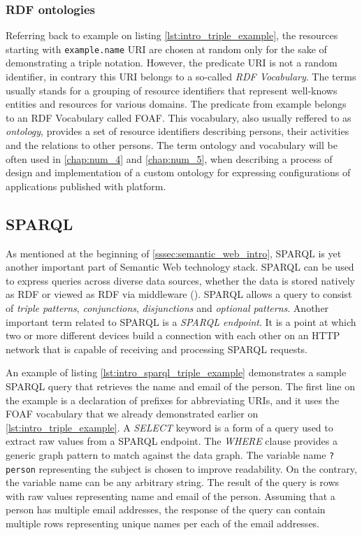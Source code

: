 \subsubsection{RDF ontologies}

Referring back to example on listing \autoref{lst:intro_triple_example}, the resources starting with \texttt{example.name} URI are chosen at random only for the sake of demonstrating a triple notation. However, the predicate URI is not a random identifier, in contrary this URI belongs to a so-called \textit{RDF Vocabulary}. The terms usually stands for a grouping of resource identifiers that represent well-knows entities and resources for various domains. The predicate from example belongs to an RDF Vocabulary called \gls{FOAF}. This vocabulary, also usually reffered to as \textit{ontology}, provides a set of resource identifiers describing persons, their activities and the relations to other persons. The term ontology and vocabulary will be often used in \autoref{chap:num_4} and \autoref{chap:num_5}, when describing a process of design and implementation of a custom ontology for expressing configurations of applications published with \lpa{} platform.

\subsection{SPARQL}

As mentioned at the beginning of \autoref{sssec:semantic_web_intro}, SPARQL is yet another important part of Semantic Web technology stack. SPARQL can be used to express queries across diverse data sources, whether the data is stored natively as RDF or viewed as RDF via middleware (\cite{Seaborne:08:SQL}). SPARQL allows a query to consist of \textit{triple patterns}, \textit{conjunctions}, \textit{disjunctions} and \textit{optional patterns}. Another important term related to SPARQL is a \textit{SPARQL endpoint}. It is a point at which two or more different devices build a connection with each other on an HTTP network that is capable of receiving and processing SPARQL requests.

An example of listing \autoref{lst:intro_sparql_triple_example} demonstrates a sample SPARQL query that retrieves the name and email of the person. The first line on the example is a declaration of prefixes for abbreviating URIs, and it uses the FOAF vocabulary that we already demonstrated earlier on \autoref{lst:intro_triple_example}. A \textit{SELECT} keyword is a form of a query used to extract raw values from a SPARQL endpoint. The \textit{WHERE} clause provides a generic graph pattern to match against the data graph. The variable name \texttt{?person} representing the subject is chosen to improve readability. On the contrary, the variable name can be any arbitrary string. The result of the query is rows with raw values representing name and email of the person. Assuming that a person has multiple email addresses, the response of the query can contain multiple rows representing unique names per each of the email addresses. 

